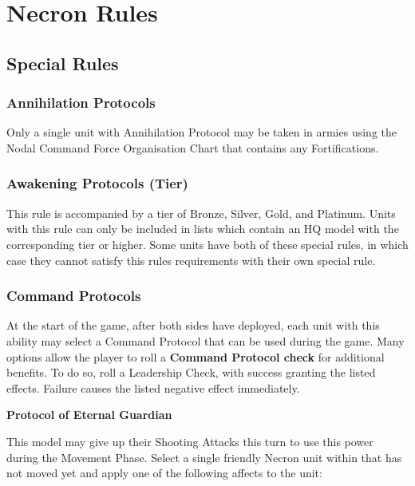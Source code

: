 \section{Necron Rules}

\subsection{Special Rules}

\subsubsection{Annihilation Protocols} \label{Annihilation Protocols}

Only a single unit with Annihilation Protocol may be taken in armies using the Nodal Command Force Organisation Chart that contains any Fortifications.

\subsubsection{Awakening Protocols (Tier)} \label{Awakening Protocols}

This rule is accompanied by a tier of Bronze, Silver, Gold, and Platinum. Units with this rule can only be included in lists which contain an HQ model with the corresponding  tier or higher. Some units have both of these special rules, in which case they cannot satisfy this rules requirements with their own  special rule.

\subsubsection{Command Protocols} \label{Command Protocols}

At the start of the game, after both sides have deployed, each unit with this ability may select a Command Protocol that can be used during the game. Many options allow the player to roll a \textbf{Command Protocol check} for additional benefits. To do so, roll a Leadership Check, with success granting the listed effects. Failure causes the listed negative effect immediately.

\textbf{Protocol of Eternal Guardian}

This model may give up their Shooting Attacks this turn to use this power during the Movement Phase. Select a single friendly Necron unit within  that has not moved yet and apply one of the following affects to the unit:

